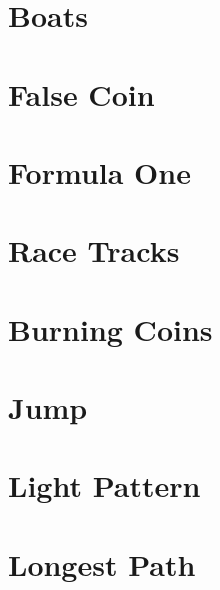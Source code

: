 \documentclass[a4paper, 10pt]{article}
\let\stdsection\section
\renewcommand\section{\newpage\stdsection}
\newcommand{\includecode}[1]{
    }
\newcommand{\algoAuthor}{2} %
\begin{document}
    \section{Boats}
        \label{sec:boats}
        \includecode{../problems/w02/Boats/Boats\algoAuthor.cpp}
        
    \section{False Coin}
        \label{sec:false_coin}
        \includecode{../problems/w02/False_Coin/FalseCoin\algoAuthor.cpp}
        
    \section{Formula One}
        \label{sec:formula_one}
        \includecode{../problems/w02/Formulas/Formulas\algoAuthor.cpp}
        
    \section{Race Tracks}
        \label{sec:race_tracks}
        \includecode{../problems/w02/Race_Tracks/RaceTracks\algoAuthor.cpp}

    
    \section{Burning Coins}
        \label{sec:burning_coins}
        \includecode{../problems/w03/Burning_Coins/BurningCoins\algoAuthor.cpp}
        
    \section{Jump}
        \label{sec:jump}
        \includecode{../problems/w03/Jump/Jump\algoAuthor.cpp}
        
    \section{Light Pattern}
        \label{sec:light_pattern}
        \includecode{../problems/w03/Light_Pattern/LightPattern\algoAuthor.cpp}
        
    \section{Longest Path}
        \label{sec:longest_path}
        \includecode{../problems/w03/Longest_Path/LongestPath\algoAuthor.cpp}
             
\end{document}
